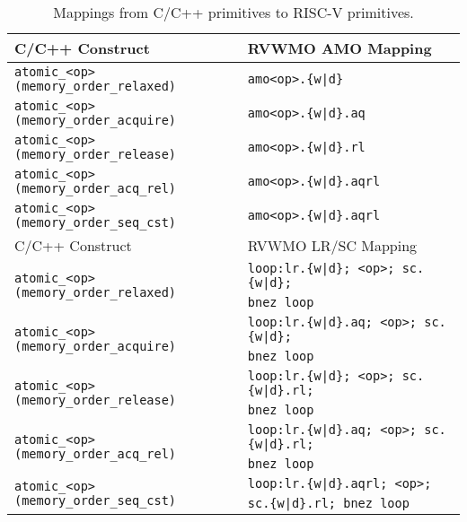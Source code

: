 \begin{table}[h!]
\begin{tabular}{|l|l|}
    \hline
    \hline
    C/C++ Construct                           & RVWMO AMO Mapping        \\
    \hline
    \tt atomic\_<op>(memory\_order\_relaxed)  & \tt amo<op>.\{w|d\}      \\
    \hline
    \tt atomic\_<op>(memory\_order\_acquire)  & \tt amo<op>.\{w|d\}.aq   \\
    \hline
    \tt atomic\_<op>(memory\_order\_release)  & \tt amo<op>.\{w|d\}.rl   \\
    \hline
    \tt atomic\_<op>(memory\_order\_acq\_rel) & \tt amo<op>.\{w|d\}.aqrl \\
    \hline
    \tt atomic\_<op>(memory\_order\_seq\_cst) & \tt amo<op>.\{w|d\}.aqrl \\
    \hline
    \hline
    C/C++ Construct                           & RVWMO LR/SC Mapping\\
    \hline
    \multirow{2}{*}{\tt atomic\_<op>(memory\_order\_relaxed)}
      & \tt loop:\@ lr.\{w|d\}; <op>; sc.\{w|d\}; \\
      & \tt bnez loop \\
    \hline
    \multirow{2}{*}{\tt atomic\_<op>(memory\_order\_acquire)}
      & \tt loop:\@ lr.\{w|d\}.aq; <op>; sc.\{w|d\}; \\
      & \tt bnez loop \\
    \hline
    \multirow{2}{*}{\tt atomic\_<op>(memory\_order\_release)}
      & \tt loop:\@ lr.\{w|d\}; <op>; sc.\{w|d\}.rl; \\
      & \tt bnez loop \\
    \hline
    \multirow{2}{*}{\tt atomic\_<op>(memory\_order\_acq\_rel)}
      & \tt loop:\@ lr.\{w|d\}.aq; <op>; sc.\{w|d\}.rl; \\
      & \tt bnez loop \\
    \hline
    \multirow{2}{*}{\tt atomic\_<op>(memory\_order\_seq\_cst)}
      & \tt loop:\@ lr.\{w|d\}.aqrl; <op>; \\
      & \tt sc.\{w|d\}.rl; bnez loop \\
    \hline
  \end{tabular}
  \caption{Mappings from C/C++ primitives to RISC-V primitives.}
  \label{tab:c11mappings}
\end{table}

